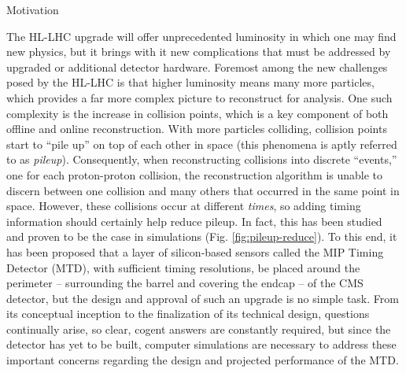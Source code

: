 %
%

\begin{section}{Motivation}

The HL-LHC upgrade will offer unprecedented luminosity in which one may find new physics, but it brings with it new complications that must be addressed by upgraded or additional detector hardware. Foremost among the new challenges posed by the HL-LHC is that higher luminosity means many more particles, which provides a far more complex picture to reconstruct for analysis. One such complexity is the increase in collision points, which is a key component of both offline and online reconstruction. With more particles colliding, collision points start to ``pile up'' on top of each other in space (this phenomena is aptly referred to as \textit{pileup}). Consequently, when reconstructing collisions into discrete ``events,'' one for each proton-proton collision, the reconstruction algorithm is unable to discern between one collision and many others that occurred in the same point in space. However, these collisions occur at different \textit{times}, so adding timing information should certainly help reduce pileup. In fact, this has been studied and proven to be the case in simulations (Fig. \ref{fig:pileup-reduce}). To this end, it has been proposed that a layer of silicon-based sensors called the MIP Timing Detector (MTD), with sufficient timing resolutions, be placed around the perimeter -- surrounding the barrel and covering the endcap -- of the CMS detector, but the design and approval of such an upgrade is no simple task. From its conceptual inception to the finalization of its technical design, questions continually arise, so clear, cogent answers are constantly required, but since the detector has yet to be built, computer simulations are necessary to address these important concerns regarding the design and projected performance of the MTD.


\end{section}
